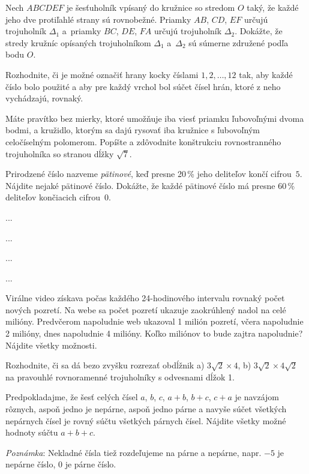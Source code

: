 {%
Nech $ABCDEF$ je šesťuholník vpísaný do kružnice so stredom $O$ taký, že každé jeho dve protiľahlé strany sú rovnobežné. Priamky $AB$, $CD$, $EF$ určujú trojuholník $\Delta_1$ a~priamky $BC$, $DE$, $FA$ určujú trojuholník $\Delta_2$. Dokážte, že stredy kružníc opísaných trojuholníkom $\Delta_1$ a~$\Delta_2$ sú súmerne združené podľa bodu $O$.}

{%
Rozhodnite, či je možné označiť hrany kocky číslami $1,2,\dots,12$ tak, aby každé číslo bolo použité a aby pre každý vrchol bol súčet čísel hrán, ktoré z neho vychádzajú, rovnaký.
}

{%
Máte pravítko bez mierky, ktoré umožňuje iba viesť priamku ľubovoľnými dvoma bodmi, a kružidlo, ktorým sa dajú rysovať iba kružnice s ľubovoľným celočíselným polomerom. Popíšte a zdôvodnite konštrukciu rovnostranného trojuholníka so stranou dĺžky $\sqrt7$.
}

{%
Prirodzené číslo nazveme \emph{pätinové}, keď presne 20\,\% jeho deliteľov končí cifrou~$5$.
 Nájdite nejaké pätinové číslo.
 Dokážte, že každé pätinové číslo má presne 60\,\% deliteľov končiacich cifrou~$0$.\endgraf
}

{%
...}

{%
...}

{%
...}

{%
...}

{%
Virálne video získava počas každého 24-hodinového intervalu rovnaký počet nových pozretí. Na webe sa počet pozretí ukazuje zaokrúhlený nadol na celé milióny. Predvčerom napoludnie web ukazoval 1 milión pozretí, včera napoludnie 2 milióny, dnes napoludnie 4 milióny. Koľko miliónov to bude zajtra napoludnie? Nájdite všetky možnosti.
}

{%
Rozhodnite, či sa dá bezo zvyšku rozrezať obdĺžnik a) $3\sqrt2 \times 4$, b) $3\sqrt2 \times 4\sqrt2$ na pravouhlé rovnoramenné trojuholníky s odvesnami dĺžok 1.
}

{%
Predpokladajme, že šesť celých čísel $a$, $b$, $c$, $a+b$, $b+c$, $c+a$ je navzájom rôznych, aspoň jedno je nepárne, aspoň jedno párne a navyše súčet všetkých nepárnych čísel je rovný súčtu všetkých párnych čísel. Nájdite všetky možné hodnoty súčtu $a+b+c$.

\emph{Poznámka}: Nekladné čísla tiež rozdeľujeme na párne a nepárne, napr. $-5$ je nepárne číslo, $0$ je párne číslo.
}

